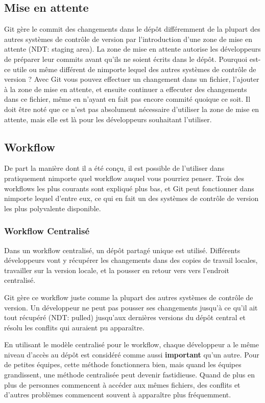 \subsection{Mise en attente}
Git gère le commit des changements dans le dépôt différemment de la plupart des autres systèmes de contrôle de version par l'introduction d'une zone de mise en attente (NDT: staging area).
La zone de mise en attente autorise les développeurs de préparer leur commits avant qu'ils ne soient écrits dans le dépôt.
Pourquoi est-ce utile ou même différent de nimporte lequel des autres systèmes de contrôle de version ? 
Avec Git vous pouvez effectuer un changement dans un fichier, l'ajouter à la zone de mise en attente, et ensuite continuer a effecuter des changements dans ce fichier, même en n'ayant en fait pas encore commité quoique ce soit.
Il doit être noté que ce n'est pas absolument nécessaire d'utiliser la zone de mise en attente, mais elle est là pour les développeurs souhaitant l'utiliser.

\subsection{Workflow}
De part la manière dont il a été conçu, il est possible de l'utiliser dans pratiquement nimporte quel workflow auquel vous pourriez penser.
Trois des workflows les plus courants sont expliqué plus bas, et Git peut fonctionner dans nimporte lequel d'entre eux, ce qui en fait un des systèmes de contrôle de version les plus polyvalente disponible.

\subsubsection{Workflow Centralisé}
Dans un workflow centralisé, un dépôt partagé unique est utilisé.
Différents développeurs vont y récupérer les changements dans des copies de travail locales, travailler sur la version locale, et la pousser en retour vers vers l'endroit centralisé.

Git gère ce workflow juste comme la plupart des autres systèmes de contrôle de version.
Un développeur ne peut pas pousser ses changements jusqu'à ce qu'il ait tout récupéré (NDT: pulled) jusqu'aux dernières versions du dépôt central et résolu les conflits qui auraient pu apparaître.

En utilisant le modèle centralisé pour le workflow, chaque développeur a le même niveau d'accès au dépôt est considéré comme aussi \textbf{important} qu'un autre.
Pour de petites équipes, cette méthode fonctionnera bien, mais quand les équipes grandissent, une méthode centralisée peut devenir fastidieuse.
Quand de plus en plus de personnes commencent à accéder aux mêmes fichiers, des conflits et d'autres problèmes commencent souvent à apparaître plus fréquemment.

